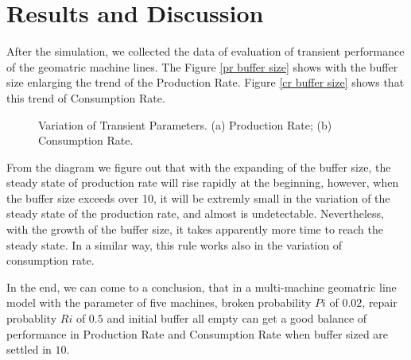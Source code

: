 \section{Results and Discussion}
\noindent After the simulation, we collected the data of evaluation of transient performance of the geomatric machine lines. The Figure \ref{pr buffer size} shows with the buffer size enlarging the trend of the Production Rate. Figure \ref{cr buffer size} shows that this trend of Consumption Rate.

\begin{figure*}[!h]
    \centering
    \caption{Variation of Transient Parameters. (a) Production Rate; (b) Consumption Rate.}
    \label{p c rate N buffer}
\end{figure*}

From the diagram we figure out that with the expanding of the buffer size, the steady state of production rate will rise rapidly at the beginning, however, when the buffer size exceeds over 10,  it will be extremly small in the variation of the steady state of the production rate, and almost is undetectable. Nevertheless, with the growth of the buffer size, it takes apparently more time to reach the steady state. In a similar way, this rule works also in the variation of consumption rate. 

In the end, we can come to a conclusion, that in a multi-machine geomatric line model with the parameter of five machines, broken probability $Pi$ of $0.02$, repair probablity $Ri$ of $0.5$ and initial buffer all empty can get a good balance of performance in Production Rate and Consumption Rate when buffer sized are settled in $10$.